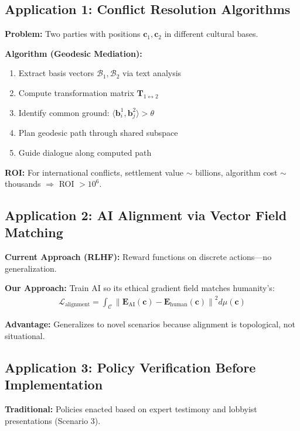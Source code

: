\documentclass[11pt,a4paper]{article}
\theoremstyle{definition}
\theoremstyle{remark}
\newcommand{\CC}{\mathcal{C}}
\newcommand{\EE}{\mathbf{E}}
\newcommand{\bb}{\mathbf{b}}
\newcommand{\cc}{\mathbf{c}}
\newcommand{\TT}{\mathbf{T}}
\begin{document}
\begin{small}
\subsection{Application 1: Conflict Resolution Algorithms}

\textbf{Problem:} Two parties with positions $\cc_1, \cc_2$ in different cultural bases.

\textbf{Algorithm (Geodesic Mediation):}

\begin{enumerate}[label=\textbf{Step \arabic*:}]
\item Extract basis vectors $\mathcal{B}_1, \mathcal{B}_2$ via text analysis
\item Compute transformation matrix $\TT_{1 \leftrightarrow 2}$
\item Identify common ground: $\langle \bb_i^1, \bb_j^2 \rangle > \theta$
\item Plan geodesic path through shared subspace
\item Guide dialogue along computed path
\end{enumerate}

\textbf{ROI:} For international conflicts, settlement value $\sim$ billions, algorithm cost $\sim$ thousands $\Rightarrow$ ROI $> 10^6$.

\subsection{Application 2: AI Alignment via Vector Field Matching}

\textbf{Current Approach (RLHF):} Reward functions on discrete actions—no generalization.

\textbf{Our Approach:} Train AI so its ethical gradient field matches humanity's:
\begin{align}
\mathcal{L}_{\text{alignment}} = \int_{\CC} \left\|\EE_{\text{AI}}(\cc) - \EE_{\text{human}}(\cc)\right\|^2 d\mu(\cc)
\end{align}

\textbf{Advantage:} Generalizes to novel scenarios because alignment is topological, not situational.

\subsection{Application 3: Policy Verification Before Implementation}

\textbf{Traditional:} Policies enacted based on expert testimony and lobbyist presentations (Scenario 3).


\end{small}
\end{document}
